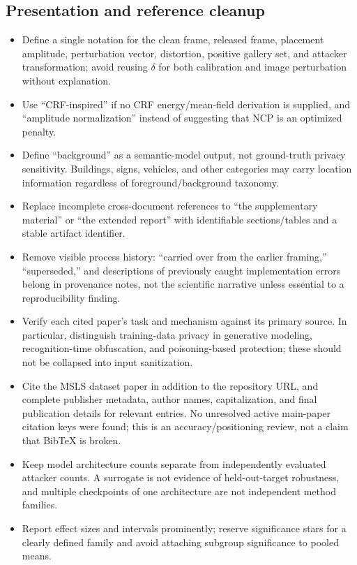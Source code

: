 \documentclass[11pt,a4paper]{article}
\begin{document}
\subsection{Presentation and reference cleanup}
\begin{itemize}
\item Define a single notation for the clean frame, released frame, placement amplitude, perturbation vector, distortion, positive gallery set, and attacker transformation; avoid reusing $\delta$ for both calibration and image perturbation without explanation.
\item Use ``CRF-inspired'' if no CRF energy/mean-field derivation is supplied, and ``amplitude normalization'' instead of suggesting that NCP is an optimized penalty.
\item Define ``background'' as a semantic-model output, not ground-truth privacy sensitivity. Buildings, signs, vehicles, and other categories may carry location information regardless of foreground/background taxonomy.
\item Replace incomplete cross-document references to ``the supplementary material'' or ``the extended report'' with identifiable sections/tables and a stable artifact identifier.
\item Remove visible process history: ``carried over from the earlier framing,'' ``superseded,'' and descriptions of previously caught implementation errors belong in provenance notes, not the scientific narrative unless essential to a reproducibility finding.
\item Verify each cited paper's task and mechanism against its primary source. In particular, distinguish training-data privacy in generative modeling, recognition-time obfuscation, and poisoning-based protection; these should not be collapsed into input sanitization.
\item Cite the MSLS dataset paper in addition to the repository URL, and complete publisher metadata, author names, capitalization, and final publication details for relevant entries. No unresolved active main-paper citation keys were found; this is an accuracy/positioning review, not a claim that BibTeX is broken.
\item Keep model architecture counts separate from independently evaluated attacker counts. A surrogate is not evidence of held-out-target robustness, and multiple checkpoints of one architecture are not independent method families.
\item Report effect sizes and intervals prominently; reserve significance stars for a clearly defined family and avoid attaching subgroup significance to pooled means.
\end{itemize}
\end{document}
